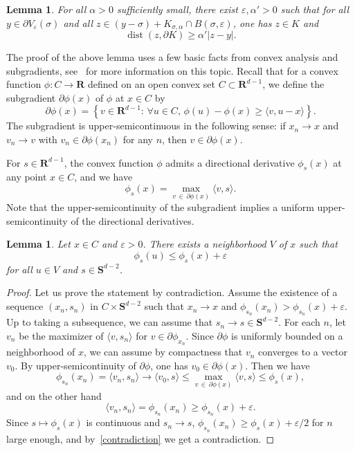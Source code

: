\documentclass[10pt]{amsart}
\newtheorem{lemm}[theo]{Lemma}\newtheorem{prop}[theo]{Proposition}\newtheorem{coro}[theo]{Corollary}\newtheorem{conj}[theo]{Conjecture}
\theoremstyle{definition}\newtheorem{defi}[theo]{Definition}\newtheorem{rema}[theo]{Remark}\newtheorem{exam}[theo]{Example}\newtheorem{exem}[theo]{Example}\newtheorem{nota}[theo]{Notation}
\DeclareMathOperator{\dist}{dist}
\newcommand{\bfS}{\mathbf{S}}
\newcommand{\bfR}{\mathbf{R}}
\renewcommand{\epsilon}{\varepsilon}
\renewcommand{\leq}{\leqslant}
\renewcommand{\geq}{\geqslant}
\let\oldforall\forall
\renewcommand*{\forall}{\mathrel{\oldforall}}
\begin{document}
\begin{lemm}\label{inclusion_smaller_cone}
For all $\alpha>0$ sufficiently small, there exist $\epsilon,\alpha'>0$ such that for all $y\in \partial V_{\epsilon}(\sigma)$ and all $z\in (y-\sigma)+K_{\sigma,\alpha}\cap B(\sigma,\epsilon)$, one has $z\in K$ and
\[
\dist(z,\partial K)\geq\alpha'|z-y|.
\]
\end{lemm}

The proof of the above lemma uses a few basic facts from convex analysis and subgradients, see~\cite[Section~D]{HiLe-01} for more information on this topic. Recall that for a convex function $\phi: C\rightarrow \bfR$ defined on an open convex set $C\subset \bfR^{d-1}$, we define the subgradient $\partial \phi (x)$ of $\phi$ at $x\in C$ by
\[
\partial \phi (x)=\left\{ v\in \bfR^{d-1}:\, \forall u\in C,\,\phi(u)-\phi(x)\geq \langle v,u-x\rangle\right\}.
\]
The subgradient is upper-semicontinuous in the following sense: if $x_{n}\rightarrow x$ and $v_{n}\rightarrow v$ with $v_{n}\in \partial\phi(x_{n})$ for any $n$, then $v\in \partial\phi(x)$.

For $s\in\bfR^{d-1}$, the convex function $\phi$ admits a directional derivative $\phi_{s}(x)$ at any point $x\in C$, and we have
\[
\phi_{s}(x)=\max_{v\,\in\,\partial \phi(x)}\langle v,s\rangle.
\]
Note that the upper-semicontinuity of the subgradient implies a uniform upper-semicontinuity of the directional derivatives.

\begin{lemm}\label{upper_continuity_derivative}
Let $x\in C$ and $\epsilon>0$. There exists a neighborhood $V$ of $x$ such that
\[
\phi_{s}(u)\leq \phi_{s}(x)+\epsilon
\]
for all $u\in V$ and $s\in \bfS^{d-2}$.
\end{lemm}


\begin{proof}
Let us prove the statement by contradiction. Assume the existence of a sequence $(x_{n},s_{n})$ in $C\times \bfS^{d-2}$ such that $x_{n}\rightarrow x$ and $\phi_{s_{n}}(x_{n})> \phi_{s_{n}}(x)+\epsilon$. Up to taking a subsequence, we can assume that $s_{n}\rightarrow s\in \bfS^{d-2}$. For each $n$, let $v_{n}$ be the maximizer of $\langle v,s_{n}\rangle$ for $v\in \partial\phi_{x_{n}}$. Since $\partial \phi$ is uniformly bounded on a neighborhood of $x$, we can assume by compactness that $v_{n}$ converges to a vector $v_{0}$. By upper-semicontinuity of $\partial \phi$, one has $v_{0}\in \partial \phi(x)$. Then we have
\begin{equation}\label{contradiction}
\phi_{s_{n}}(x_{n})=\langle v_{n},s_{n}\rangle \rightarrow \langle v_{0},s\rangle\leq \max_{v\,\in\,\partial \phi(x)}\langle v,s\rangle\leq \phi_{s}(x),
\end{equation}
and on the other hand
\[
\langle v_{n},s_{n}\rangle= \phi_{s_{n}}(x_{n})\geq \phi_{s_{n}}(x)+\epsilon.
\]
Since $s\mapsto \phi_{s}(x)$ is continuous and $s_{n}\rightarrow s$, $\phi_{s_{n}}(x_{n})\geq \phi_{s}(x) +\epsilon/2$ for $n$ large enough, and by~\eqref{contradiction} we get a contradiction.
\end{proof}
\end{document}
